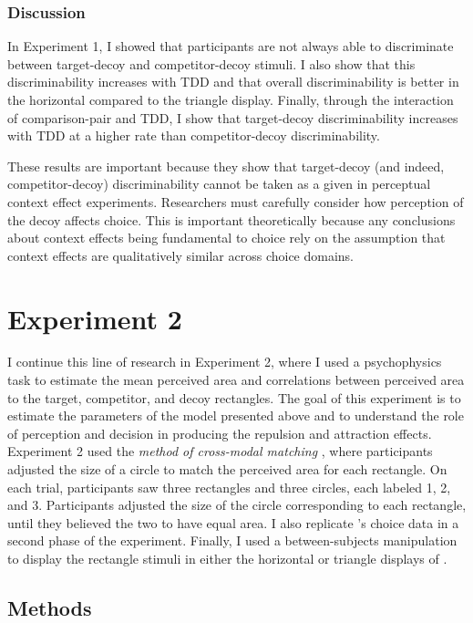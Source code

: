 \subsubsection{Discussion}
In Experiment 1, I showed that participants are not always able to discriminate between target-decoy and competitor-decoy stimuli. I also show that this discriminability increases with TDD and that overall discriminability is better in the horizontal compared to the triangle display. Finally, through the interaction of comparison-pair and TDD, I show that target-decoy discriminability increases with TDD at a higher rate than competitor-decoy discriminability. 

These results are important because they show that target-decoy (and indeed, competitor-decoy) discriminability cannot be taken as a given in perceptual context effect experiments. Researchers must carefully consider how perception of the decoy affects choice. This is important theoretically because any conclusions about context effects being fundamental to choice \parencite{trueblood2013not} rely on the assumption that context effects are qualitatively similar across choice domains.

\section{Experiment 2}
I continue this line of research in Experiment 2, where I used a psychophysics task to estimate the mean perceived area and correlations between perceived area to the target, competitor, and decoy rectangles. The goal of this experiment is to estimate the parameters of the model presented above and to understand the role of perception and decision in producing the repulsion and attraction effects. Experiment 2 used the \textit{method of cross-modal matching} \parencite{stevensCrossmodalityMatchingBrightness1965}, where participants adjusted the size of a circle to match the perceived area for each rectangle. On each trial, participants saw three rectangles and three circles, each labeled 1, 2, and 3. Participants adjusted the size of the circle corresponding to each rectangle, until they believed the two to have equal area. I also replicate \textcite{spektorWhenGoodLooks2018b}'s choice data in a second phase of the experiment. Finally, I used a between-subjects manipulation to display the rectangle stimuli in either the horizontal or triangle displays of \textcite{spektorWhenGoodLooks2018b}.

\subsection{Methods}
